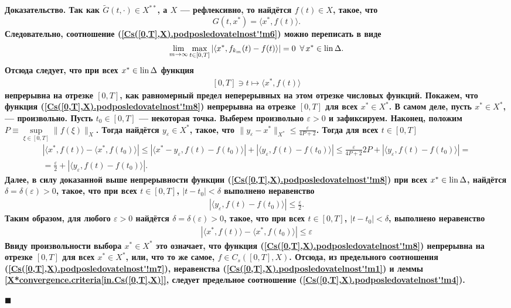 \documentclass{report}
\newenvironment{Proof}{\par\noindent\bf Доказательство.\rm}{ $\blacksquare$\par}
\newcommand{\lin}{\mathop{\rm lin}\nolimits}
\begin{document}
\begin{Proof}
Так как $\tilde G(t,\cdot)\in X^{**}$, а $X$ --- рефлексивно, то найдётся $f(t)\in X$, такое, что
$$
G(t,x^*)=\langle x^*,f(t)\rangle.
$$
Следовательно, соотношение (\ref{Cs([0,T],X).podposledovatelnost'!m6}) можно переписать в виде
\begin{gather}\label{Cs([0,T],X).podposledovatelnost'!m7}
\lim\limits_{m\to\infty}\max\limits_{t\in[0,T]}|\langle x^*,f_{k_m}(t)-f(t)\rangle|=0\,\,\,\forall\,x^*\in\lin\Delta.
\end{gather}
Отсюда следует, что при всех $x^*\in\lin\Delta$ функция
\begin{gather}\label{Cs([0,T],X).podposledovatelnost'!m8}
[0,T]\ni t\mapsto\langle x^*,f(t)\rangle
\end{gather}
непрерывна на отрезке $[0,T]$, как равномерный предел неперерывных на этом отрезке числовых функций. Покажем, что функция (\ref{Cs([0,T],X).podposledovatelnost'!m8}) непрерывна на отрезке
$[0,T]$ для всех $x^*\in X^*$. В самом деле, пусть $x^*\in X^*$, --- произвольно. Пусть $t_0\in[0,T]$ --- некоторая точка. Выберем произвольно $\varepsilon>0$ и зафиксируем.  Наконец,
положим $P\equiv\sup\limits_{\xi\in[0,T]}\|f(\xi)\|_X$. Тогда найдётся $y_\varepsilon\in X^*$, такое, что $\|y_\varepsilon-x^*\|_{X^*}\leqslant\frac\varepsilon{4P+2}$. Тогда для всех
$t\in[0,T]$
\begin{gather*}
|\langle x^*,f(t)\rangle-\langle x^*,f(t_0)\rangle|\leqslant|\langle x^*-y_\varepsilon,f(t)-f(t_0)\rangle|+|\langle y_\varepsilon,
f(t)-f(t_0)\rangle|\leqslant\frac\varepsilon{4P+2}2P+|\langle y_\varepsilon,f(t)-f(t_0)\rangle|=\\
=\frac\varepsilon2+|\langle y_\varepsilon,f(t)-f(t_0)\rangle|.
\end{gather*}
Далее, в силу доказанной выше непрерывности функции (\ref{Cs([0,T],X).podposledovatelnost'!m8}) при всех $x^*\in\lin\Delta$, найдётся $\delta=\delta(\varepsilon)>0$, такое, что при всех
$t\in[0,T]$, $|t-t_0|<\delta$ выполнено неравенство
\begin{gather*}
|\langle y_\varepsilon,f(t)-f(t_0)\rangle|\leqslant\frac\varepsilon2.
\end{gather*}
Таким образом, для любого $\varepsilon>0$ найдётся $\delta=\delta(\varepsilon)>0$, такое, что при всех $t\in[0,T]$, $|t-t_0|<\delta$, выполнено неравенство
\begin{gather*}
|\langle x^*,f(t)\rangle-\langle x^*,f(t_0)\rangle|\leqslant\varepsilon
\end{gather*}
Ввиду произвольности выбора $x^*\in X^*$ это означает, что функция (\ref{Cs([0,T],X).podposledovatelnost'!m8}) непрерывна на отрезке $[0,T]$ для всех $x^*\in X^*$, или, что то же самое,
$f\in C_s([0,T],X)$. Отсюда, из предельного соотношения (\ref{Cs([0,T],X).podposledovatelnost'!m7}), неравенства (\ref{Cs([0,T],X).podposledovatelnost'!m1}) и леммы
\ref{X*convergence.criteria[in.Cs([0,T],X)]}, следует предельное соотношение (\ref{Cs([0,T],X).podposledovatelnost'!m4}).


\end{Proof}
\end{document}
